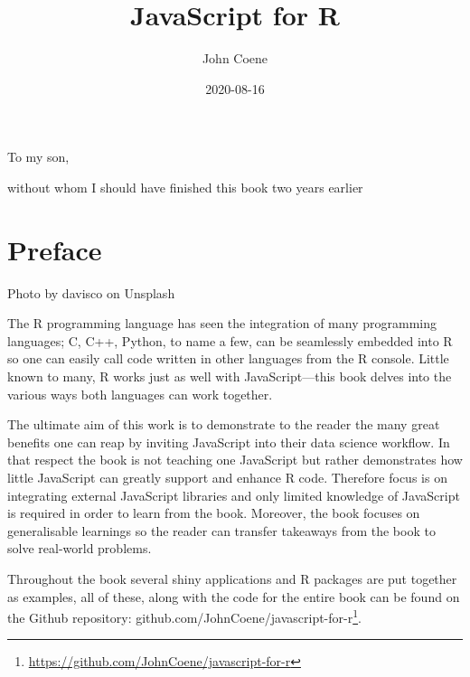 \documentclass[
]{krantz}
\title{JavaScript for R}
\author{John Coene}
\date{2020-08-16}
\renewcommand{\href}[2]{#2\footnote{\url{#1}}}
\begin{document}
\maketitle


\thispagestyle{empty}

\begin{center}
To my son,

without whom I should have finished this book two years earlier
\end{center}

\setlength{\abovedisplayskip}{-5pt}
\setlength{\abovedisplayshortskip}{-5pt}

{
\hypersetup{linkcolor=}
\setcounter{tocdepth}{2}
\tableofcontents
}
\listoftables
\listoffigures
\hypertarget{preface}{%
\chapter*{Preface}\label{preface}}


{Photo by davisco on Unsplash}

The R programming language has seen the integration of many programming languages; C, C++, Python, to name a few, can be seamlessly embedded into R so one can easily call code written in other languages from the R console. Little known to many, R works just as well with JavaScript---this book delves into the various ways both languages can work together.

The ultimate aim of this work is to demonstrate to the reader the many great benefits one can reap by inviting JavaScript into their data science workflow. In that respect the book is not teaching one JavaScript but rather demonstrates how little JavaScript can greatly support and enhance R code. Therefore focus is on integrating external JavaScript libraries and only limited knowledge of JavaScript is required in order to learn from the book. Moreover, the book focuses on generalisable learnings so the reader can transfer takeaways from the book to solve real-world problems.

Throughout the book several shiny applications and R packages are put together as examples, all of these, along with the code for the entire book can be found on the Github repository: \href{https://github.com/JohnCoene/javascript-for-r}{github.com/JohnCoene/javascript-for-r}.
\end{document}
